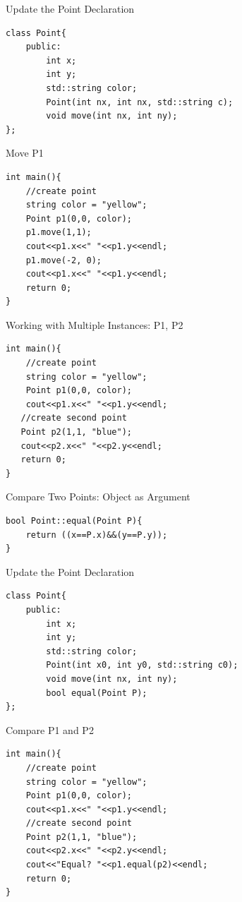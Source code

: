 \documentclass[xcolor={dvipsnames}]{beamer}
\begin{document}
\begin{frame}[fragile]{Update the Point Declaration}
\begin{verbatim}
class Point{
    public:
        int x;
        int y;
        std::string color;
        Point(int nx, int nx, std::string c);
        void move(int nx, int ny);
};
\end{verbatim}
\end{frame}


\begin{frame}[fragile]{Move P1}
\begin{verbatim}
int main(){
    //create point
    string color = "yellow";
    Point p1(0,0, color);
    p1.move(1,1);
    cout<<p1.x<<" "<<p1.y<<endl;
    p1.move(-2, 0);
    cout<<p1.x<<" "<<p1.y<<endl;
    return 0;
}
\end{verbatim}
\end{frame}


\begin{frame}[fragile]{Working with Multiple Instances: P1, P2}
\begin{verbatim}
int main(){
    //create point
    string color = "yellow";
    Point p1(0,0, color);
    cout<<p1.x<<" "<<p1.y<<endl;
   //create second point
   Point p2(1,1, "blue");
   cout<<p2.x<<" "<<p2.y<<endl;
   return 0;
}
\end{verbatim}
\end{frame}

\begin{frame}[fragile]{Compare Two Points: Object as Argument}
\begin{verbatim}
bool Point::equal(Point P){
    return ((x==P.x)&&(y==P.y));
}
\end{verbatim}
\end{frame}

\begin{frame}[fragile]{Update the Point Declaration}
\begin{verbatim}
class Point{
    public:
        int x;
        int y;
        std::string color;
        Point(int x0, int y0, std::string c0);
        void move(int nx, int ny);
        bool equal(Point P);
};
\end{verbatim}
\end{frame}

\begin{frame}[fragile]{Compare P1 and P2}
\begin{verbatim}
int main(){
    //create point
    string color = "yellow";
    Point p1(0,0, color);
    cout<<p1.x<<" "<<p1.y<<endl;
    //create second point
    Point p2(1,1, "blue");
    cout<<p2.x<<" "<<p2.y<<endl;
    cout<<"Equal? "<<p1.equal(p2)<<endl;
    return 0;
}
\end{verbatim}
\end{frame}
\end{document}
